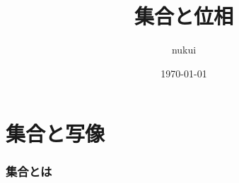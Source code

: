\documentclass{jsarticle}
\begin{document}
\title{集合と位相}
\author{nukui}
\date{\today}
\maketitle


\part{集合と写像}
\section{集合とは}


\end{document}
